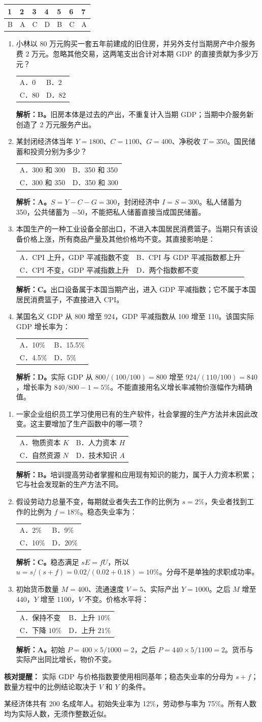 \documentclass[UTF8,11pt,a4paper,fontset=fandol]{ctexart}
\makeatletter
\newcommand{\sect}[1]{\par\vspace{0.7em}{\large\bfseries #1}\par\vspace{0.6em}}
\newcommand{\choices}[4]{\par\nopagebreak\begin{tabularx}{\linewidth}{@{}XX@{}}A．#1&B．#2\\C．#3&D．#4\end{tabularx}\par}
\newcommand{\ans}[1]{\par\textbf{解析：}#1\par}
\makeatother
\begin{document}
\newpage\sect{二、单选题（每题 4 分，共 28 分）}
\par\smallskip\begin{tabularx}{\linewidth}{|*{7}{Y|}}&2&3&4&5&6&7\\\hline
B&A&C&D&B&C&A\\\hline
\end{tabularx}\par\smallskip
\begin{enumerate}[label=\arabic*.,start=1,leftmargin=*,itemsep=1.05em]
\item 小林以 80 万元购买一套五年前建成的旧住房，并另外支付当期房产中介服务费 2 万元。忽略其他交易，这两笔支出合计对本期 GDP 的直接贡献为多少万元？
\choices{0}{2}{80}{82}
\ans{\textbf{B。}旧房本体是过去的产出，不重复计入当期 GDP；当期中介服务新创造了 2 万元服务产出。}
\item 某封闭经济体当年 $Y=1800$、$C=1100$、$G=400$、净税收 $T=350$。国民储蓄和投资分别为多少？
\choices{300 和 300}{350 和 350}{300 和 350}{350 和 300}
\ans{\textbf{A。}$S=Y-C-G=300$，封闭经济中 $I=S=300$。私人储蓄为 350，公共储蓄为 $-50$，不能把私人储蓄直接当成国民储蓄。}
\item 本国生产的一种工业设备全部出口，不进入本国居民消费篮子。当期只有该设备价格上涨，所有商品产量及其他价格均不变。其直接影响是：
\choices{CPI 上升，GDP 平减指数不变}{CPI 与 GDP 平减指数都上升}{CPI 不变，GDP 平减指数上升}{两个指数都不变}
\ans{\textbf{C。}出口设备属于本国当期产出，进入 GDP 平减指数；它不属于本国居民消费篮子，不直接进入 CPI。}
\item 某国名义 GDP 从 800 增至 924，GDP 平减指数从 100 增至 110。该国实际 GDP 增长率为：
\choices{10\%}{15.5\%}{4.5\%}{5\%}
\ans{\textbf{D。}实际 GDP 从 $800/(100/100)=800$ 增至 $924/(110/100)=840$，增长率为 $840/800-1=5\%$。不能直接用名义增长率减物价涨幅作为精确值。}
\end{enumerate}
\newpage\sect{二、单选题解析（续）}
\begin{enumerate}[label=\arabic*.,start=5,leftmargin=*,itemsep=1.05em]
\item 一家企业组织员工学习使用已有的生产软件，社会掌握的生产方法并未因此改变。这主要增加了生产函数中的哪一项？
\choices{物质资本 $K$}{人力资本 $H$}{自然资源 $N$}{技术知识 $A$}
\ans{\textbf{B。}培训提高劳动者掌握和应用现有知识的能力，属于人力资本积累；它与社会发现新的生产方法不同。}
\item 假设劳动力总量不变，每期就业者失去工作的比例为 $s=2\%$，失业者找到工作的比例为 $f=18\%$。稳态失业率为：
\choices{2\%}{9\%}{10\%}{20\%}
\ans{\textbf{C。}稳态满足 $sE=fU$，所以 $u=s/(s+f)=0.02/(0.02+0.18)=10\%$。分母不是单独的求职成功率。}
\item 初始货币数量 $M=400$、流通速度 $V=5$、实际产出 $Y=1000$。之后 $M$ 增至 440，$Y$ 增至 1100，$V$ 不变。价格水平将：
\choices{保持不变}{上升 $10\%$}{下降 $10\%$}{上升 $21\%$}
\ans{\textbf{A。}初始 $P=400\times5/1000=2$，之后 $P=440\times5/1100=2$。货币与实际产出同比增长，物价不变。}
\end{enumerate}
\medskip\textbf{核对提醒：}
实际 GDP 与价格指数要使用相同基年；稳态失业率的分母为 $s+f$；数量方程中的比例结论取决于 $V$ 和 $Y$ 的条件。
\newpage\sect{三、计算题（20 分）}
某经济体共有 200 名成年人。初始失业率为 12\%，劳动参与率为 75\%。所有人数均为实际人数，无须作整数近似。
\end{document}
